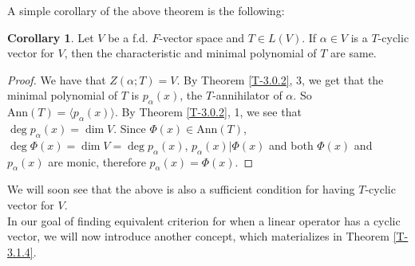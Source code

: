 \documentclass[letterpaper,11pt,twoside]{article}
\theoremstyle{definition}
\theoremstyle{definition}
\theoremstyle{definition}
\theoremstyle{definition}
\theoremstyle{definition}
\theoremstyle{definition}
\theoremstyle{remark}
\theoremstyle{definition}
\newtheorem{corollary}[proposition]{Corollary}
\newcommand{\Ann}[1]{\text{Ann}\left(#1\right)}
\newcommand{\gen}[1]{\langle #1\rangle}
\begin{document}
    A simple corollary of the above theorem is the following:
    \begin{corollary}\label{C-3.1.2}
    Let $V$ be a f.d. $F$-vector space and $T\in L(V)$. If $\alpha\in V$ is a $T$-cyclic vector for $V$, then the characteristic and minimal polynomial of $T$ are same.
    \end{corollary}
    \begin{proof}
    We have that $Z(\alpha;T) = V$. By Theorem \ref{T-3.0.2}, 3, we get that the minimal polynomial of $T$ is $p_\alpha(x)$, the $T$-annihilator of $\alpha$. So $\Ann{T} = \gen{p_\alpha(x)}$. By Theorem \ref{T-3.0.2}, 1, we see that $\deg p_\alpha(x) = \dim V$. Since $\Phi(x) \in \Ann{T}$, $\deg \Phi(x) = \dim V = \deg p_{\alpha}(x)$, $p_\alpha(x) | \Phi(x)$ and both $\Phi(x)$ and $p_\alpha(x)$ are monic, therefore $p_\alpha(x) = \Phi(x)$.
    \end{proof}
    We will soon see that the above is also a sufficient condition for having $T$-cyclic vector for $V$.\\
    
    In our goal of finding equivalent criterion for when a linear operator has a cyclic vector, we will now introduce another concept, which materializes in Theorem \ref{T-3.1.4}.
\end{document}
